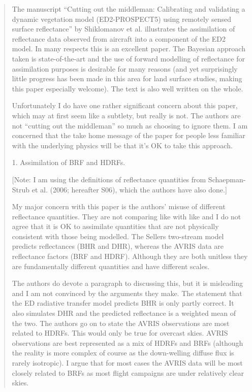 \begin{quote}
The manuscript “Cutting out the middleman: Calibrating and validating a dynamic vegetation model (ED2-PROSPECT5) using remotely sensed surface reflectance” by Shiklomanov et al. illustrates the assimilation of reflectance data observed from aircraft into a component of the ED2 model. In many respects this is an excellent paper. The Bayesian approach taken is state-of-the-art and the use of forward modelling of reflectance for assimilation purposes is desirable for many reasons (and yet surprisingly little progress has been made in this area for land surface studies, making this paper especially welcome). The text is also well written on the whole.

Unfortunately I do have one rather significant concern about this paper, which may at first seem like a subtlety, but really is not. The authors are not “cutting out the middleman” so much as choosing to ignore them. I am concerned that the take home message of the paper for people less familiar with the underlying physics will be that it’s OK to take this approach.

1. Assimilation of BRF and HDRFs.

[Note: I am using the definitions of reflectance quantities from Schaepman-Strub et al.
(2006; hereafter S06), which the authors have also done.]

My major concern with this paper is the authors’ misuse of different reflectance quantities. They are not comparing like with like and I do not agree that it is OK to assimilate quantities that are not physically consistent with those being modelled. The Sellers two-stream model predicts reflectances (BHR and DHR), whereas the AVRIS data are reflectance factors (BRF and HDRF). Although they are both unitless they are fundamentally different quantities and have different scales.

The authors do devote a paragraph to discussing this, but it is misleading and I am not convinced by the arguments they make. The statement that the ED radiative transfer model predicts BHR is only partly correct. It also simulates DHR and the predicted reflectance is a weighted mean of the two. The authors go on to state the AVRIS observations are most related to HDRFs. This would only be true for overcast skies. AVRIS observations are best represented as a mix of HDRFs and BRFs (although the reality is more complex of course as the down-welling diffuse flux is rarely isotropic). I argue that for most cases the AVRIS data will be most closely related to BRFs as most flight campaigns are under relatively clear skies.


\end{quote}
